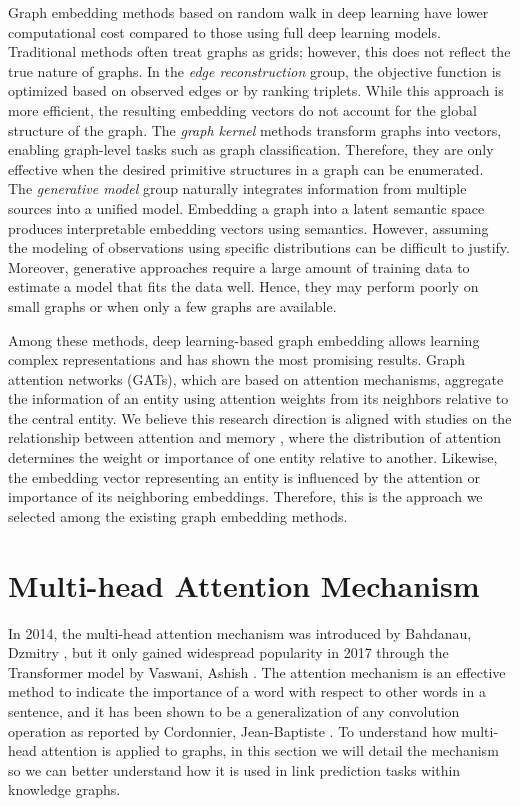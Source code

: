 Graph embedding methods based on random walk in deep learning have lower computational cost compared to those using full deep learning models. Traditional methods often treat graphs as grids; however, this does not reflect the true nature of graphs. In the \textit{edge reconstruction} group, the objective function is optimized based on observed edges or by ranking triplets. While this approach is more efficient, the resulting embedding vectors do not account for the global structure of the graph. The \textit{graph kernel} methods transform graphs into vectors, enabling graph-level tasks such as graph classification. Therefore, they are only effective when the desired primitive structures in a graph can be enumerated. The \textit{generative model} group naturally integrates information from multiple sources into a unified model. Embedding a graph into a latent semantic space produces interpretable embedding vectors using semantics. However, assuming the modeling of observations using specific distributions can be difficult to justify. Moreover, generative approaches require a large amount of training data to estimate a model that fits the data well. Hence, they may perform poorly on small graphs or when only a few graphs are available.

Among these methods, deep learning-based graph embedding allows learning complex representations and has shown the most promising results. Graph attention networks (GATs), which are based on attention mechanisms, aggregate the information of an entity using attention weights from its neighbors relative to the central entity. We believe this research direction is aligned with studies on the relationship between attention and memory \cite{memoryandattention:2020}, where the distribution of attention determines the weight or importance of one entity relative to another. Likewise, the embedding vector representing an entity is influenced by the attention or importance of its neighboring embeddings. Therefore, this is the approach we selected among the existing graph embedding methods.

\section{Multi-head Attention Mechanism}

In 2014, the multi-head attention mechanism was introduced by Bahdanau, Dzmitry \cite{bahdanau2014neural}, but it only gained widespread popularity in 2017 through the Transformer model by Vaswani, Ashish \cite{vaswani2017attention}. The attention mechanism is an effective method to indicate the importance of a word with respect to other words in a sentence, and it has been shown to be a generalization of any convolution operation as reported by Cordonnier, Jean-Baptiste \cite{cordonnier2019relationship}. To understand how multi-head attention is applied to graphs, in this section we will detail the mechanism so we can better understand how it is used in link prediction tasks within knowledge graphs.

